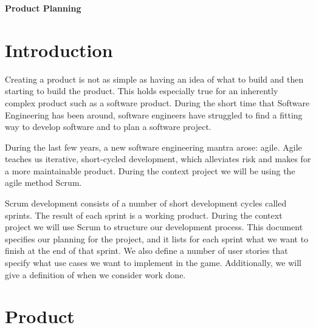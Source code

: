 \documentclass{article}
\begin{document}
\begin{minipage}[H]{\textwidth}
\vspace{0.3cm}
		\begin{center}
		
		\vspace{0.3cm}
			\Huge{\textbf{Product Planning}}\\
		\vspace{0.3cm}	
		
		\vspace{0.7cm}	
		\end{center}
\end{minipage}

\tableofcontents
\pagebreak
\section{Introduction}
Creating a product is not as simple as having an idea of what to build and then starting to build the product. This holds especially true for an inherently complex product such as a software product. During the short time that Software Engineering has been around, software engineers have struggled to find a fitting way to develop software and to plan a software project.

During the last few years, a new software engineering mantra arose: agile. Agile teaches us iterative, short-cycled development, which alleviates risk and makes for a more maintainable product. During the context project we will be using the agile method Scrum.

Scrum development consists of a number of short development cycles called sprints. The result of each sprint is a working product. During the context project we will use Scrum to structure our development process. This document specifies our planning for the project, and it lists for each sprint what we want to finish at the end of that sprint. We also define a number of user stories that specify what use cases we want to implement in the game. Additionally, we will give a definition of when we consider work done.
\pagebreak
\section{Product}
\end{document}
